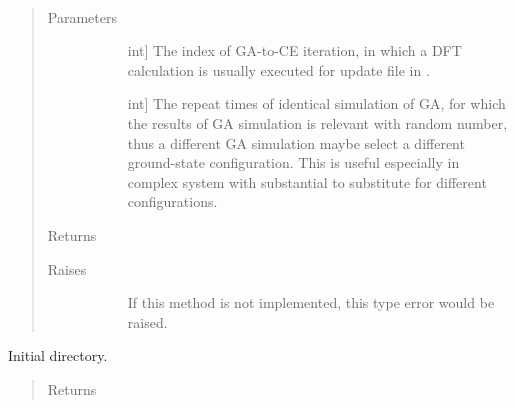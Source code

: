\documentclass[letterpaper,10pt,english]{sphinxmanual}
\begin{document}
\begin{fulllineitems}
\begin{fulllineitems}
\end{fulllineitems}


\begin{fulllineitems}
\label{\detokenize{pygace:pygace.gace.AbstractApp.run}}~\begin{quote}\begin{description}
\item[{Parameters}] \leavevmode\begin{description}
\item[{}] \leavevmode{[}int{]}
The index of GA-to-CE iteration, in which a DFT calculation is
usually executed for update  file in .

\item[{}] \leavevmode{[}int{]}
The repeat times of identical simulation of GA, for which the
results of GA simulation is relevant with random number, thus
a different GA simulation maybe select a different ground-state
configuration. This is useful especially in complex system with
substantial  to substitute for different configurations.

\end{description}

\item[{Returns}] \leavevmode\begin{description}
\item[{}] \leavevmode
\end{description}

\item[{Raises}] \leavevmode\begin{description}
\item[{}] \leavevmode
If this method is not implemented, this type error would be raised.

\end{description}

\end{description}\end{quote}

\end{fulllineitems}


\begin{fulllineitems}
\label{\detokenize{pygace:pygace.gace.AbstractApp.set_dir}}
Initial directory.
\begin{quote}\begin{description}
\item[{Returns}] \leavevmode\begin{description}
\item[{}] \leavevmode
\end{description}


\end{description}
\end{quote}
\end{fulllineitems}
\end{fulllineitems}
\end{document}
